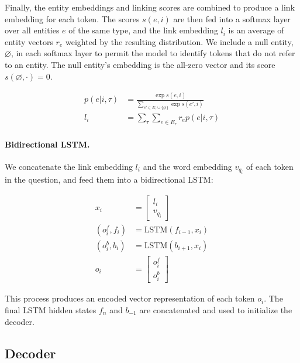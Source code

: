Finally, the entity embeddings and linking scores are combined to produce a 
link embedding for each token.
The scores $s(e,i)$ are then fed into a softmax layer over all entities $e$ of 
the same type, and the link embedding $l_{i}$ is an average of entity vectors 
$r_e$ weighted by the resulting distribution.
We include a null entity, $\varnothing$, in each softmax layer to permit the 
model to identify tokens that do not refer to an entity. The null entity's 
embedding is the all-zero vector and its score $s(\varnothing, \cdot) = 0$.

\begin{align}
p(e | i, \tau) & = \frac{\exp{s(e,i)}}{\sum_{e'\in E_\tau \cup \{\varnothing\}} 
\exp{s(e',i)}} \\
l_{i} & = \sum_\tau \sum_{e \in E_\tau} r_e p(e | i, \tau)
\end{align}

\paragraph{Bidirectional LSTM.}
We concatenate the link embedding $l_i$ and the word embedding $v_{q_i}$ of 
each token in the question, and feed them into a bidirectional LSTM:

\begin{align}
x_i &= \begin{bmatrix} l_{i} \\ v_{q_i} \end{bmatrix} \\
(o^f_i, f_i) &= \text{LSTM}(f_{i-1}, x_i) \\
(o^b_i, b_i) &= \text{LSTM}(b_{i+1}, x_i) \\
o_i &= \begin{bmatrix} o^f_i \\  o^b_i \end{bmatrix}
\end{align}

This process produces an encoded vector representation of each token $o_i$. The 
final LSTM hidden states $f_n$ and $b_{-1}$ are concatenated  and used to 
initialize the decoder.

\subsection{Decoder}
\label{sec:nnsp_decoder}

